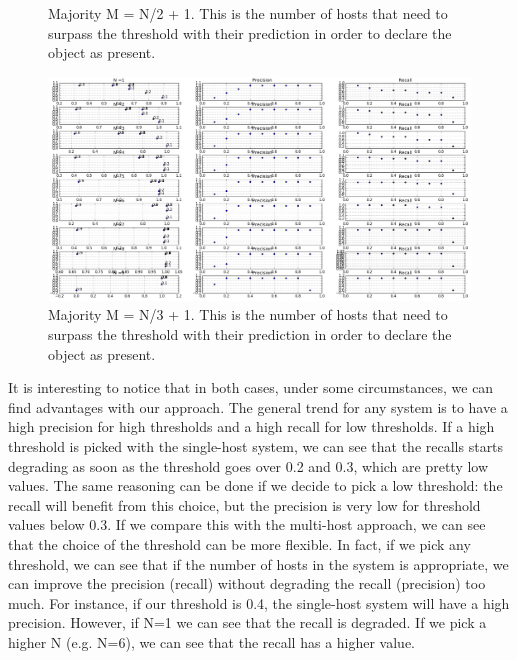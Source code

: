 \documentclass[10pt,conference,compsocconf]{IEEEtran}
\begin{document}
\begin{enumerate}
\begin{figure}
	\caption {Majority M = N/2 + 1. This is the number of hosts that need to surpass the threshold with their prediction in order to declare the object as present.}
	\label{fig:person_FP_FN_summary_majority2}
\end{figure}
\begin{figure}
	\captionsetup{type=figure}
	\includegraphics[width=\textwidth]{img/summary_majority_THIRD_BIG.png}
	\caption {Majority M = N/3 + 1. This is the number of hosts that need to surpass the threshold with their prediction in order to declare the object as present.}
	\label{fig:person_FP_FN_summary_majority3}
\end{figure}
It is interesting to notice that in both cases, under some circumstances, we can find advantages with our approach. The general trend for any system is to have a high precision for high thresholds and a high recall for low thresholds. If a high threshold is picked with the single-host system, we can see that the recalls starts degrading as soon as the threshold goes over 0.2 and 0.3, which are pretty low values. The same reasoning can be done if we decide to pick a low threshold: the recall will benefit from this choice, but the precision is very low for threshold values below 0.3.
If we compare this with the multi-host approach, we can see that the choice of the threshold can be more flexible. In fact, if we pick any threshold, we can see that if the number of hosts in the system is appropriate, we can improve the precision (recall) without degrading the recall (precision) too much.
For instance, if our threshold is 0.4, the single-host system will have a high precision. However, if N=1 we can see that the recall is degraded. If we pick a higher N (e.g. N=6), we can see that the recall has a higher value.

\end{enumerate}
\end{document}
